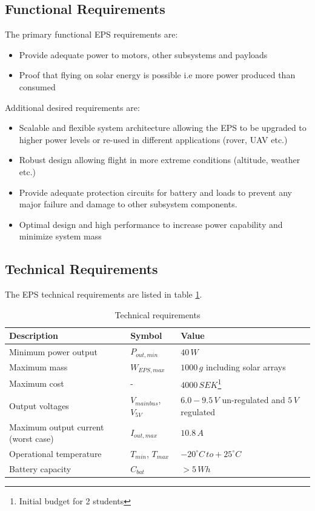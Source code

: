 \subsection{Functional Requirements}
The primary functional \ac{EPS} requirements are:
%
\begin{itemize}
\item Provide adequate power to motors, other subsystems and payloads
\item Proof that flying on solar energy is possible i.e more power produced than consumed
\end{itemize}
%
Additional desired requirements are:
%
\begin{itemize}
\item Scalable and flexible system architecture allowing the \ac{EPS} to be upgraded to higher power levels or re-used in different applications (rover, \ac{UAV} etc.)
\item Robust design allowing flight in more extreme conditions (altitude, weather etc.)
\item Provide adequate protection circuits for battery and loads to prevent any major failure and damage to other subsystem components.
\item Optimal design and high performance to increase power capability and minimize system mass
\end{itemize}
%
\subsection{Technical Requirements}
The \ac{EPS} technical requirements are listed in table \ref{tab:technical_requirements}.
%
\begin{table}[H]
\centering
\caption{Technical requirements}
\label{tab:technical_requirements}
\begin{minipage}{\textwidth}
\begin{tabular}{p{}p{}p{}}
\hline
\textbf{Description} & \textbf{Symbol} & \textbf{Value}\\
\hline
Minimum power output & $P_{out,min}$ & $40\,W$\\
Maximum mass & $W_{EPS,max}$ & $1000\,g$ including solar arrays\\
Maximum cost & - & $4000\,SEK$\footnote{Initial budget for 2 students}\\
Output voltages & $V_{mainbus}$, $V_{5V}$ & $6.0-9.5\,V$ un-regulated and $5\,V$ regulated\\
Maximum output current (worst case) & $I_{out,max}$ & $10.8\,A$\\
Operational temperature & $T_{min}$, $T_{max}$ & $-20^{\circ}C\,to +25^{\circ}C$\\
Battery capacity & $C_{bat}$ & $>5\,Wh$\\
\hline
\end{tabular}\par
\vspace{-0.75\skip\footins}
\renewcommand{\footnoterule}{}
\end{minipage}
\end{table}

